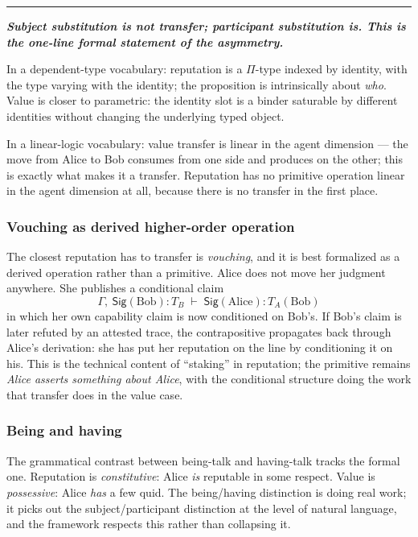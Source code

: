 \documentclass[11pt]{article}
\newcommand{\position}[1]{%
  \medskip
  \begin{quoting}[indentfirst=false, leftmargin=1em, rightmargin=1em]
  \noindent\textcolor{rhosky}{\rule{3pt}{1.2em}}\hspace{0.5em}\textbf{\textit{#1}}
  \end{quoting}
  \medskip
}
\newcommand{\Sig}{\mathsf{Sig}}
\begin{document}
\position{Subject substitution is not transfer; participant substitution is. This is the one-line formal statement of the asymmetry.}

In a dependent-type vocabulary: reputation is a $\Pi$-type indexed by identity, with the type varying with the identity; the proposition is intrinsically about \emph{who}. Value is closer to parametric: the identity slot is a binder saturable by different identities without changing the underlying typed object.

In a linear-logic vocabulary: value transfer is linear in the agent dimension --- the move from Alice to Bob consumes from one side and produces on the other; this is exactly what makes it a transfer. Reputation has no primitive operation linear in the agent dimension at all, because there is no transfer in the first place.

\subsubsection*{Vouching as derived higher-order operation}

The closest reputation has to transfer is \emph{vouching}, and it is best formalized as a derived operation rather than a primitive. Alice does not move her judgment anywhere. She publishes a conditional claim
\[
\Gamma,\ \Sig(\text{Bob}) : T_B \;\vdash\; \Sig(\text{Alice}) : T_A(\text{Bob})
\]
in which her own capability claim is now conditioned on Bob's. If Bob's claim is later refuted by an attested trace, the contrapositive propagates back through Alice's derivation: she has put her reputation on the line by conditioning it on his. This is the technical content of ``staking'' in reputation; the primitive remains \emph{Alice asserts something about Alice}, with the conditional structure doing the work that transfer does in the value case.

\subsubsection*{Being and having}

The grammatical contrast between being-talk and having-talk tracks the formal one. Reputation is \emph{constitutive}: Alice \emph{is} reputable in some respect. Value is \emph{possessive}: Alice \emph{has} a few quid. The being/having distinction is doing real work; it picks out the subject/participant distinction at the level of natural language, and the framework respects this rather than collapsing it.
\end{document}
